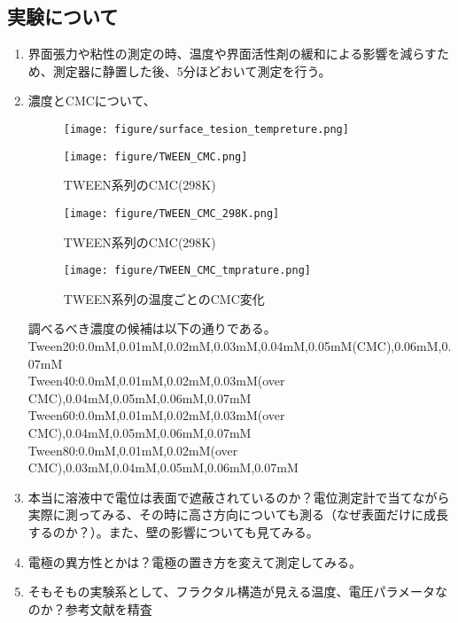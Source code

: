 \documentclass{ltjsarticle}
\begin{document}
\subsection{実験について}
\begin{enumerate}
  \item 界面張力や粘性の測定の時、温度や界面活性剤の緩和による影響を減らすため、測定器に静置した後、{\color{red}5分ほどおいて}測定を行う。
  \item 濃度とCMCについて、
        \begin{figure}[H]
          \begin{minipage}[H]{0.49\columnwidth}
            \centering
            \texttt{[image: figure/surface\_tesion\_tempreture.png]}
            \caption{TWEEN系列の界面張力の濃度依存性(30\si{\degreeCelsius})\cite{kothekar2007comparative}}
            \label{fig:界面張力の濃度依存性}
          \end{minipage}
          \begin{minipage}[H]{0.49\columnwidth}
            \centering
            \texttt{[image: figure/TWEEN\_CMC.png]}
            \caption{TWEEN系列のCMC(298\si{\kelvin})\cite{hait2001determination}}
            \label{fig:TWEENのCMC}
          \end{minipage}
        \end{figure}
        \begin{figure}[H]
          \centering
          \texttt{[image: figure/TWEEN\_CMC\_298K.png]}
          \caption{TWEEN系列のCMC(298\si{\kelvin})\cite{hait2001determination}}
          \label{fig:TWEENのCMC2}
        \end{figure}
        \begin{figure}
          \centering
          \texttt{[image: figure/TWEEN\_CMC\_tmprature.png]}
          \caption{TWEEN系列の温度ごとのCMC変化\cite{mahmood2013effect}}
          \label{fig:TWEENのCMCの温度変化}
        \end{figure}
        調べるべき濃度の候補は以下の通りである。\\
        Tween20:0.0mM,0.01mM,0.02mM,0.03mM,0.04mM,0.05mM(CMC),0.06mM,0.07mM\\
        Tween40:0.0mM,0.01mM,0.02mM,0.03mM(over CMC),0.04mM,0.05mM,0.06mM,0.07mM\\
        Tween60:0.0mM,0.01mM,0.02mM,0.03mM(over CMC),0.04mM,0.05mM,0.06mM,0.07mM\\
        Tween80:0.0mM,0.01mM,0.02mM(over CMC),0.03mM,0.04mM,0.05mM,0.06mM,0.07mM\\
  \item {\color{red}本当に溶液中で電位は表面で遮蔽されているのか？}\rightarrow 電位測定計で当てながら実際に測ってみる、その時に高さ方向についても測る（なぜ表面だけに成長するのか？）。また、壁の影響についても見てみる。
  \item 電極の異方性とかは？\rightarrow 電極の置き方を変えて測定してみる。
  \item {\color{red}そもそもの実験系として、フラクタル構造が見える温度、電圧パラメータなのか？\rightarrow 参考文献を精査}
\end{enumerate}
\end{document}
